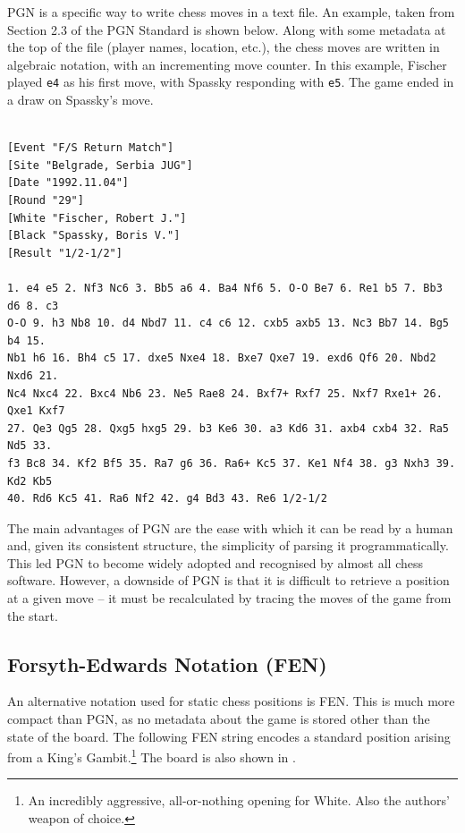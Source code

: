 PGN is a specific way to write chess moves in a text file. An example, taken
from Section 2.3 of the PGN Standard \citep{pgnNotation} is shown below. Along
with some metadata at the top of the file (player names, location, etc.\@), the
chess moves are written in algebraic notation, with an incrementing move
counter. In this example, Fischer played \texttt{e4} as his first move, with
Spassky responding with \texttt{e5}. The game ended in a draw on Spassky's
 move.

\begin{verbatim}

[Event "F/S Return Match"]
[Site "Belgrade, Serbia JUG"]
[Date "1992.11.04"]
[Round "29"]
[White "Fischer, Robert J."]
[Black "Spassky, Boris V."]
[Result "1/2-1/2"]

1. e4 e5 2. Nf3 Nc6 3. Bb5 a6 4. Ba4 Nf6 5. O-O Be7 6. Re1 b5 7. Bb3 d6 8. c3
O-O 9. h3 Nb8 10. d4 Nbd7 11. c4 c6 12. cxb5 axb5 13. Nc3 Bb7 14. Bg5 b4 15.
Nb1 h6 16. Bh4 c5 17. dxe5 Nxe4 18. Bxe7 Qxe7 19. exd6 Qf6 20. Nbd2 Nxd6 21.
Nc4 Nxc4 22. Bxc4 Nb6 23. Ne5 Rae8 24. Bxf7+ Rxf7 25. Nxf7 Rxe1+ 26. Qxe1 Kxf7
27. Qe3 Qg5 28. Qxg5 hxg5 29. b3 Ke6 30. a3 Kd6 31. axb4 cxb4 32. Ra5 Nd5 33.
f3 Bc8 34. Kf2 Bf5 35. Ra7 g6 36. Ra6+ Kc5 37. Ke1 Nf4 38. g3 Nxh3 39. Kd2 Kb5
40. Rd6 Kc5 41. Ra6 Nf2 42. g4 Bd3 43. Re6 1/2-1/2 

\end{verbatim}

The main advantages of PGN are the ease with which it can be read by a human
\citep{pgnNotation} and, given its consistent structure, the simplicity of
parsing it programmatically. This led PGN to become widely adopted and
recognised by almost all chess software. However, a downside of PGN is that it
is difficult to retrieve a position at a given move -- it must be recalculated
by tracing the moves of the game from the start.

\subsection{Forsyth-Edwards Notation (FEN)}\label{fenSection}

An alternative notation used for static chess positions is FEN. This is much
more compact than PGN, as no metadata about the game is stored other than the
state of the board. The following FEN string encodes a standard position
arising from a King's Gambit.\footnote{An incredibly aggressive, all-or-nothing
opening for White. Also the authors' weapon of choice.} The board is also shown
in .

